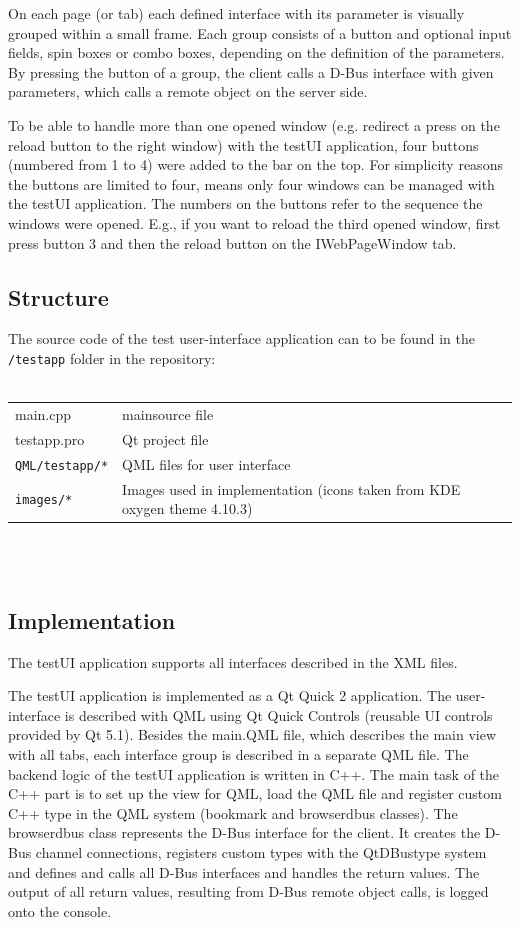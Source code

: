 \documentclass{pelagicore}
\begin{document}
On each page (or tab) each defined interface with its parameter is visually
grouped within a small frame. Each group consists of a button and optional
input fields, spin boxes or combo boxes, depending on the definition of the
parameters. By pressing the button of a group, the client calls a D-Bus
interface with given parameters, which calls a remote object on the server
side.

To be able to handle more than one opened window (e.g. redirect a press on the
reload button to the right window) with the testUI application, four buttons
(numbered from 1 to 4) were added to the bar on the top. For simplicity reasons
the buttons are limited to four, means only four windows can be managed with
the testUI application. The numbers on the buttons refer to the sequence the
windows were opened. E.g., if you want to reload the third opened window, first
press button 3 and then the reload button on the IWebPageWindow tab.

\subsection{Structure}
The source code of the test user-interface application can to be found in the
{\tt /testapp} folder in the repository:
\\\\
\begin{tabularx}{0.9\textwidth}{l X}
    main.cpp            & mainsource file \\
    testapp.pro         & Qt project file \\
    {\tt QML/testapp/*} & QML files for user interface \\
    {\tt images/*}      & Images used in implementation (icons taken from KDE
                          oxygen theme 4.10.3)
\end{tabularx}
\\\\

\subsection{Implementation}
The testUI application supports all interfaces described in the XML files.

The testUI application is implemented as a Qt Quick 2 application. The
user-interface is described with QML using Qt Quick Controls (reusable UI
controls provided by Qt 5.1).  Besides the main.QML file, which describes the
main view with all tabs, each interface group is described in a separate QML
file. The backend logic of the testUI application is written in C++. The main
task of the C++ part is to set up the view for QML, load the QML file and
register custom C++ type in the QML system (bookmark and browserdbus classes).
The browserdbus class represents the D-Bus interface for the client. It creates
the D-Bus channel connections, registers custom types with the QtDBustype system
and defines and calls all D-Bus interfaces and handles the return values. The
output of all return values, resulting from D-Bus remote object calls, is logged
onto the console.
\end{document}
